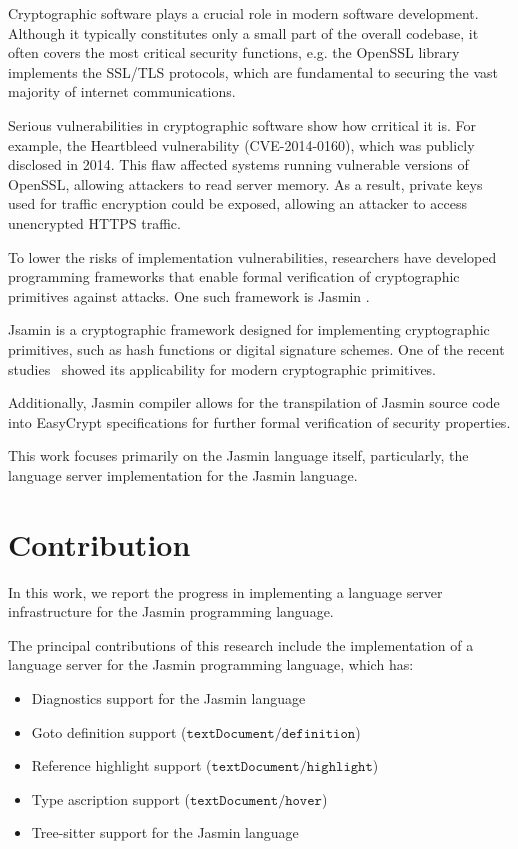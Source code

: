 Cryptographic software plays a crucial role in modern software development.
Although it typically constitutes only a small part of the overall codebase,
it often covers the most critical security functions, e.g. the
OpenSSL library implements the SSL/TLS protocols, which are fundamental to
securing the vast majority of internet communications.  

Serious vulnerabilities in cryptographic software show how crritical it is. For
example, the Heartbleed \cite{heartbleed:2014} vulnerability (CVE-2014-0160),
which was publicly disclosed in 2014. This flaw affected systems running
vulnerable versions of OpenSSL, allowing attackers to read server memory. As a
result, private keys used for traffic encryption could be exposed, allowing an
attacker to access unencrypted HTTPS traffic.

To lower the risks of implementation vulnerabilities, researchers have developed
programming frameworks that enable formal verification of cryptographic
primitives against attacks. One such framework is Jasmin
\cite{jasmin:2017}. 

Jsamin is a cryptographic framework designed for implementing cryptographic 
primitives, such as hash functions or digital signature schemes. One of the 
recent studies~\cite{jasmin-sha3:2019} showed its applicability for modern 
cryptographic primitives.

Additionally, Jasmin compiler allows for the transpilation of Jasmin source code
into EasyCrypt \cite{easycrypt:2013} specifications for further
formal verification of security properties.

This work focuses primarily on the Jasmin language itself, particularly, the
language server implementation for the Jasmin language.

\section{Contribution}

In this work, we report the progress in implementing a language server
infrastructure for the Jasmin  programming language. 

The principal contributions of this research include the implementation of a
language server for the Jasmin programming language, which has:

\begin{itemize}
    \item Diagnostics support for the Jasmin language
    \item Goto definition support ($\texttt{textDocument/definition}$)
    \item Reference highlight support ($\texttt{textDocument/highlight}$)
    \item Type ascription support ($\texttt{textDocument/hover}$)
    \item Tree-sitter support for the Jasmin language
\end{itemize}
